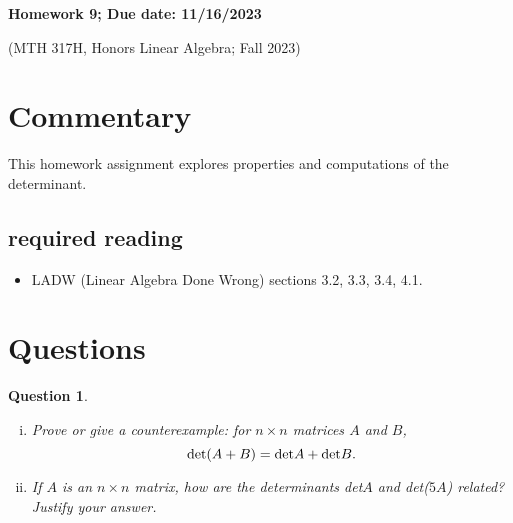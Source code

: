 \documentclass[12pt]{article}
\newtheorem{question}[thm]{Question}
\begin{document}
	\begin{LARGE}
	\begin{center}
		
		

		
	
	\textbf{Homework 9; Due date: 11/16/2023}
	

	(MTH 317H, Honors Linear Algebra;  Fall 2023)
	\end{center}
	\end{LARGE}
	\vspace{0.15in}
	
	
	

	
\section{Commentary}

This homework assignment explores properties and computations of the determinant.

\subsection{required reading}

\begin{itemize}
	\item LADW (Linear Algebra Done Wrong) sections 3.2, 3.3, 3.4, 4.1.
\end{itemize}




\section{Questions}

\vspace{.5cm}

\begin{question}
	\normalfont
	
\begin{enumerate}[(i)]

\item Prove or give a counterexample: for $n \times n$ matrices $A$ and $B$, 
\[
\textup{det}(A + B) = \textup{det} A + \textup{det} B.
\]	


\item If $A$ is an $n \times n$ matrix, how are the determinants det$A$ and det($5A$) related? Justify your answer.
 
 \end{enumerate}
 
\end{question}
\end{document}
